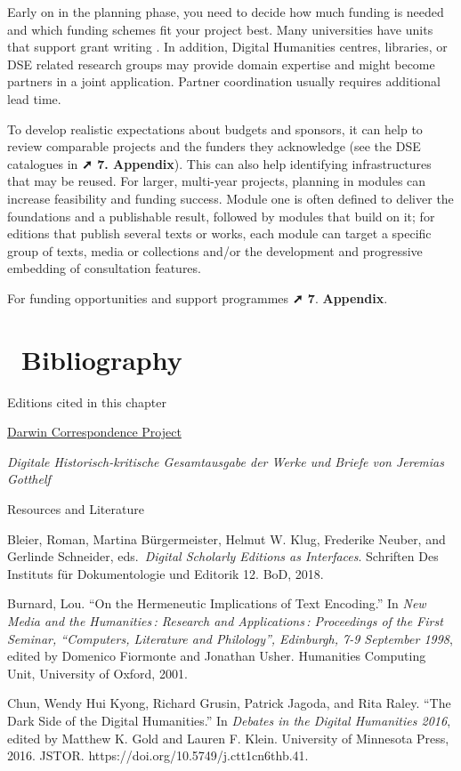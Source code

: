 \documentclass[
  letterpaper,
  DIV=11,
  numbers=noendperiod]{scrreprt}
\begin{document}
Early on in the planning phase, you need to decide how much funding is
needed and which funding schemes fit your project best. Many
universities have units that support grant writing . In addition,
Digital Humanities centres, libraries, or DSE related research groups
may provide domain expertise and might become partners in a joint
application. Partner coordination usually requires additional lead time.

To develop realistic expectations about budgets and sponsors, it can
help to review comparable projects and the funders they acknowledge (see
the DSE catalogues in \textbf{➚ 7. Appendix}). This can also help
identifying infrastructures that may be reused. For larger, multi-year
projects, planning in modules can increase feasibility and funding
success. Module one is often defined to deliver the foundations and a
publishable result, followed by modules that build on it; for editions
that publish several texts or works, each module can target a specific
group of texts, media or collections and/or the development and
progressive embedding of consultation features.

For funding opportunities and support programmes \textbf{➚ 7}.
\textbf{Appendix}.

\section{~Bibliography}\label{bibliography-2}

Editions cited in this chapter

\href{https://www.darwinproject.ac.uk/}{Darwin Correspondence Project}

\emph{Digitale Historisch-kritische Gesamtausgabe der Werke und Briefe
von Jeremias Gotthelf}

Resources and Literature

Bleier, Roman, Martina Bürgermeister, Helmut W. Klug, Frederike Neuber,
and Gerlinde Schneider, eds.~\emph{Digital Scholarly Editions as
Interfaces}. Schriften Des Instituts für Dokumentologie und Editorik 12.
BoD, 2018.

Burnard, Lou. ``On the Hermeneutic Implications of Text Encoding.'' In
\emph{New Media and the Humanities\,: Research and Applications\,:
Proceedings of the First Seminar, ``Computers, Literature and
Philology'', Edinburgh, 7-9 September 1998}, edited by Domenico
Fiormonte and Jonathan Usher. Humanities Computing Unit, University of
Oxford, 2001.

Chun, Wendy Hui Kyong, Richard Grusin, Patrick Jagoda, and Rita Raley.
``The Dark Side of the Digital Humanities.'' In \emph{Debates in the
Digital Humanities 2016}, edited by Matthew K. Gold and Lauren F. Klein.
University of Minnesota Press, 2016. JSTOR.
https://doi.org/10.5749/j.ctt1cn6thb.41.
\end{document}
